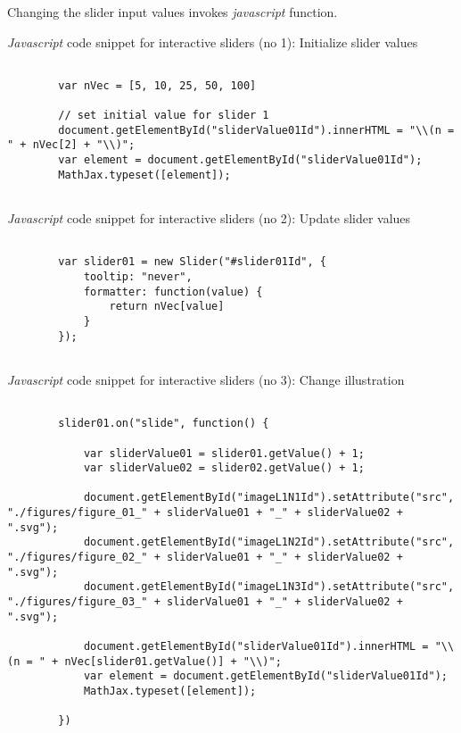 \documentclass[12pt]{article}
\begin{document}
Changing the slider input values invokes \emph{javascript} function. 

\begin{CodeSnippet}[!hp]
	\centering
	\caption{\emph{Javascript} code snippet for interactive sliders (no 1): Initialize slider values}
	\normalsize
	\vspace{0.25cm}
	\begin{BVerbatim}
		
		var nVec = [5, 10, 25, 50, 100]
		
		// set initial value for slider 1
		document.getElementById("sliderValue01Id").innerHTML = "\\(n = " + nVec[2] + "\\)";
		var element = document.getElementById("sliderValue01Id");
		MathJax.typeset([element]);
		
	\end{BVerbatim}
	\label{JsCodSniSliInt01}
\end{CodeSnippet}

\begin{CodeSnippet}[!hp]
	\centering
	\caption{\emph{Javascript} code snippet for interactive sliders (no 2): Update slider values}
	\normalsize
	\vspace{0.25cm}
	\begin{BVerbatim}
						
		var slider01 = new Slider("#slider01Id", { 
			tooltip: "never",
			formatter: function(value) {
				return nVec[value]
			} 
		});
		
	\end{BVerbatim}
	\label{JsCodSniSliInt02}
\end{CodeSnippet}

\begin{CodeSnippet}[!hp]
	\centering
	\caption{\emph{Javascript} code snippet for interactive sliders (no 3): Change illustration}
	\tiny
	\vspace{0.25cm}
	\begin{BVerbatim}
		
		slider01.on("slide", function() {
			
			var sliderValue01 = slider01.getValue() + 1;
			var sliderValue02 = slider02.getValue() + 1;
			
			document.getElementById("imageL1N1Id").setAttribute("src", "./figures/figure_01_" + sliderValue01 + "_" + sliderValue02 + ".svg");
			document.getElementById("imageL1N2Id").setAttribute("src", "./figures/figure_02_" + sliderValue01 + "_" + sliderValue02 + ".svg");
			document.getElementById("imageL1N3Id").setAttribute("src", "./figures/figure_03_" + sliderValue01 + "_" + sliderValue02 + ".svg");
			
			document.getElementById("sliderValue01Id").innerHTML = "\\(n = " + nVec[slider01.getValue()] + "\\)";
			var element = document.getElementById("sliderValue01Id");
			MathJax.typeset([element]);
			
		})
		
	\end{BVerbatim}
	\label{JsCodSniSliInt03}
\end{CodeSnippet}
\end{document}

